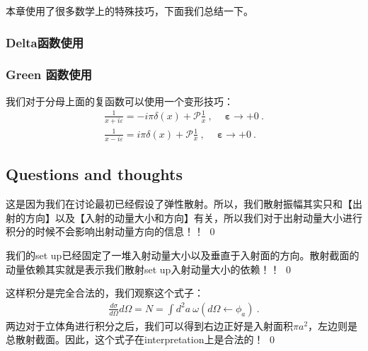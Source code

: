   本章使用了很多数学上的特殊技巧，下面我们总结一下。

  \subsubsection{Delta函数使用}
  \YL{[作业8]}

  \subsubsection{Green 函数使用}

  我们对于分母上面的复函数可以使用一个变形技巧：
  \begin{align}
    \frac{1}{x+i\varepsilon}=-i\pi\delta(x)+\mathscr{P}\frac{1}{x}\mathrm{~,~}\quad\boldsymbol{\varepsilon}\to+0\mathrm{~.}\\
    \frac{1}{x-i\varepsilon}=i\pi\delta(x)+\mathscr{P}\frac{1}{x}\mathrm{~,~}\quad\boldsymbol{\varepsilon}\to+0\mathrm{~.}
  \end{align}
  \YL{[作业8]}

  \subsection{Questions and thoughts}


  这是因为我们在讨论最初已经假设了弹性散射。所以，我们散射振幅其实只和【出射的方向】以及【入射的动量大小和方向】有关，所以我们对于出射动量大小进行积分的时候不会影响出射动量方向的信息！！
  \qed

  我们的set up已经固定了一堆入射动量大小以及垂直于入射面的方向。散射截面的动量依赖其实就是表示我们散射set up入射动量大小的依赖！！
  \qed


  这样积分是完全合法的，我们观察这个式子：
  \begin{align}
    \frac{d\sigma}{d\Omega}d\Omega=N=\int d^2a\ \omega(d
    \Omega\leftarrow \phi_a)\mathrm{~.}
  \end{align}
  两边对于立体角进行积分之后，我们可以得到右边正好是入射面积$ \pi a^2
  $，左边则是总散射截面。因此，这个式子在interpretation上是合法的！
  \qed

